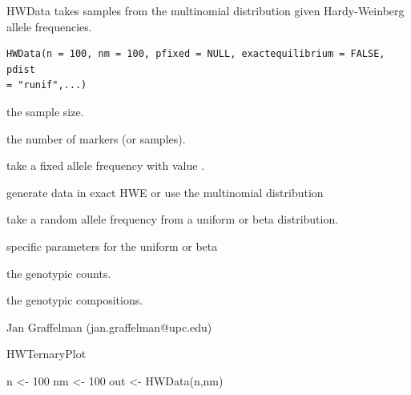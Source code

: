 \documentclass[a4paper]{article}
\begin{document}
\begin{Description}\relax
HWData takes samples from the multinomial distribution given
Hardy-Weinberg allele frequencies.
\end{Description}
\begin{Usage}
\begin{verbatim}
HWData(n = 100, nm = 100, pfixed = NULL, exactequilibrium = FALSE, pdist
= "runif",...)
\end{verbatim}
\end{Usage}
\begin{Arguments}
\begin{ldescription}
\item[\code{n}] the sample size.
\item[\code{nm}] the number of markers (or samples).
\item[\code{pfixed}] take a fixed allele frequency with value .
\item[\code{exactequilibrium}] generate data in exact HWE or use the multinomial distribution
\item[\code{pdist}] take a random allele frequency from a uniform or beta
distribution.
\item[\code{...}] specific parameters for the uniform or beta
\end{ldescription}
\end{Arguments}
\begin{Value}
\begin{ldescription}
\item[\code{Xt}] the genotypic counts.
\item[\code{Xc}] the genotypic compositions.
\end{ldescription}
\end{Value}
\begin{Author}\relax
Jan Graffelman (jan.graffelman@upc.edu)
\end{Author}
\begin{SeeAlso}\relax
HWTernaryPlot
\end{SeeAlso}
\begin{Examples}
\begin{ExampleCode}
n <- 100
nm <- 100
out <- HWData(n,nm)
\end{ExampleCode}
\end{Examples}
\end{document}
